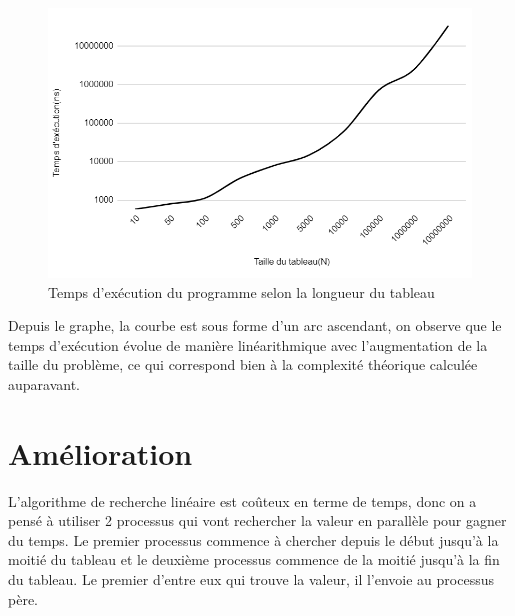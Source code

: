 \begin{figure}[H]
    \centering
        \includegraphics[scale=0.5]{./ressources/graphe_temps_execution.png}
        \caption{Temps d'exécution du programme selon la longueur du tableau}
    \label{fig:temps_exec_seq}
\end{figure}
\par
Depuis le graphe, la courbe est sous forme d'un arc ascendant, on observe que le temps d'exécution évolue de manière linéarithmique avec l'augmentation de la taille du problème, ce qui correspond bien à la complexité théorique calculée auparavant. 
\section{Amélioration}
L'algorithme de recherche linéaire est coûteux en terme de temps, donc on a pensé à utiliser 2 processus qui vont rechercher la valeur en parallèle pour gagner du temps.
Le premier processus commence à chercher depuis le début jusqu'à la moitié du tableau et le deuxième processus commence de la moitié jusqu'à la fin du tableau. Le premier d'entre eux qui trouve la valeur, il l'envoie au processus père.





